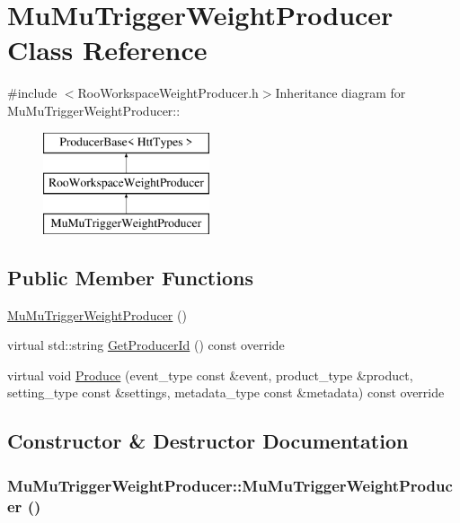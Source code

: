 \hypertarget{classMuMuTriggerWeightProducer}{
\section{MuMuTriggerWeightProducer Class Reference}
\label{classMuMuTriggerWeightProducer}
}


{\ttfamily \#include $<$RooWorkspaceWeightProducer.h$>$}Inheritance diagram for MuMuTriggerWeightProducer::\begin{figure}[H]
\begin{center}
\leavevmode
\includegraphics[height=3cm]{classMuMuTriggerWeightProducer}
\end{center}
\end{figure}
\subsection*{Public Member Functions}
\begin{DoxyCompactItemize}
\item 
\hyperlink{classMuMuTriggerWeightProducer_a85546c713c2cc2fc1bd53b51b998d61a}{MuMuTriggerWeightProducer} ()
\item 
virtual std::string \hyperlink{classMuMuTriggerWeightProducer_aceeaf94e1e0b6fa4128b3f0b3ebec900}{GetProducerId} () const override
\item 
virtual void \hyperlink{classMuMuTriggerWeightProducer_a0b8559ad9c392e68d1272ca49ad65a93}{Produce} (event\_\-type const \&event, product\_\-type \&product, setting\_\-type const \&settings, metadata\_\-type const \&metadata) const override
\end{DoxyCompactItemize}


\subsection{Constructor \& Destructor Documentation}
\hypertarget{classMuMuTriggerWeightProducer_a85546c713c2cc2fc1bd53b51b998d61a}{
\subsubsection[{MuMuTriggerWeightProducer}]{\setlength{\rightskip}{0pt plus 5cm}MuMuTriggerWeightProducer::MuMuTriggerWeightProducer ()}}
\label{classMuMuTriggerWeightProducer_a85546c713c2cc2fc1bd53b51b998d61a}


